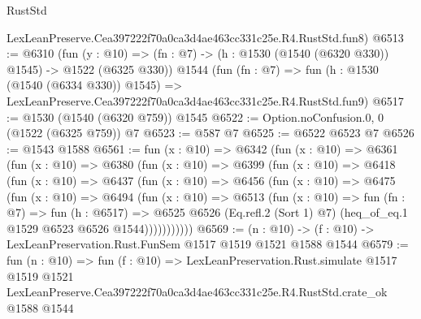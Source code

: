 \begin{lexlean}{RustStd}
\begin{coremodule}
    LexLeanPreserve.Cea397222f70a0ca3d4ae463cc331c25e.R4.RustStd.fun8)
@6513 := @6310
    (fun (y : @10) => (fn : @7) -> (h : @1530 (@1540 (@6320 @330)) @1545) -> @1522 (@6325 @330))
    @1544
    (fun (fn : @7) =>
    fun (h : @1530 (@1540 (@6334 @330)) @1545) =>
    LexLeanPreserve.Cea397222f70a0ca3d4ae463cc331c25e.R4.RustStd.fun9)
@6517 := @1530 (@1540 (@6320 @759)) @1545
@6522 := Option.noConfusion.{0, 0} (@1522 (@6325 @759)) @7
@6523 := @587 @7
@6525 := @6522 @6523 @7
@6526 := @1543 @1588
@6561 := fun (x : @10) =>
  @6342
    (fun (x : @10) =>
    @6361
      (fun (x : @10) =>
      @6380
        (fun (x : @10) =>
        @6399
          (fun (x : @10) =>
          @6418
            (fun (x : @10) =>
            @6437
              (fun (x : @10) =>
              @6456
                (fun (x : @10) =>
                @6475
                  (fun (x : @10) =>
                  @6494
                    (fun (x : @10) =>
                    @6513
                      (fun (x : @10) =>
                      fun (fn : @7) =>
                      fun (h : @6517) =>
                      @6525
                        @6526
                        (Eq.refl.{2} (Sort 1) @7)
                        (heq_of_eq.{1} @1529 @6523 @6526 @1544)))))))))))
@6569 := (n : @10) -> (f : @10) -> LexLeanPreservation.Rust.FunSem @1517 @1519 @1521 @1588 @1544
@6579 := fun (n : @10) =>
  fun (f : @10) =>
  LexLeanPreservation.Rust.simulate
    @1517
    @1519
    @1521
    LexLeanPreserve.Cea397222f70a0ca3d4ae463cc331c25e.R4.RustStd.crate_ok
    @1588
    @1544
\end{coremodule}
\end{lexlean}
